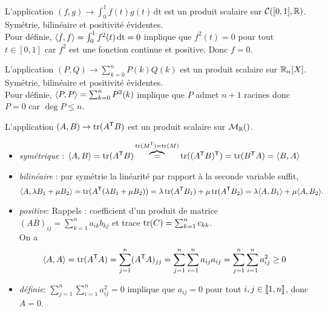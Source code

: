 \documentclass{book}
\begin{document}
\begin{Exemple}
L'application $(f,g)\to \int_0^1 f(t)g(t)\,\mathrm{dt} $ est un produit scalaire sur  $\mathcal{C}([0,1],\mathbb{R} )$.\\
Symétrie, bilinéaire et positivité évidentes.\\Pour définie, 
$\langle f,f\rangle=\int_0^1 f^2(t)\,\mathrm{dt}=0$ implique que $f^2(t)=0$ pour tout $t\in[0,1]$ car $f^2$ est une fonction continue et positive. Donc $f=0$.
\end{Exemple}
\begin{Exemple}
L'application $(P,Q)\to \sum_{k=0}^n  P(k)Q(k) $ est un produit scalaire sur  $\mathbb{R}_n[X]$.\\
Symétrie, bilinéaire et positivité évidentes.\\Pour définie, 
$\langle P,P\rangle=\sum_{k=0}^n  P^2(k)$ implique que $P$ admet $n+1$ racines donc $P=0$ car $\deg P \leq n$.
\end{Exemple}
\begin{Exemple}
L'application $(A,B)\to \operatorname{tr} (A^{\mathsf {T}}B)$ est un produit scalaire sur  $\Mn{\R}$.
\begin{itemize}
\item \emph{symétrique} : $\langle A,B\rangle =\operatorname{tr} (A^{\mathsf {T}}B)  \overbrace{=}^{\operatorname{tr} (M^{\mathsf {T}})=\operatorname{tr} (M) }\operatorname{tr} ((A^{\mathsf {T}}B)^{\mathsf {T}})= \operatorname{tr} (B^{\mathsf {T}}A) =\langle B,A\rangle$
\item \emph{bilinéaire} : par symétrie la linéarité par rapport à la seconde variable suffit,   $$\langle A,\lambda B_1+\mu  B_2 \rangle= \operatorname{tr} (A^{\mathsf {T}}(\lambda B_1+\mu  B_2))=\lambda\operatorname{tr} (A^{\mathsf {T}}B_1)+\mu\operatorname{tr} (A^{\mathsf {T}}B_2)= \lambda\langle A, B_1\rangle +\mu  \langle A,B_2 \rangle.$$
\item \emph{positive}: Rappels : coefficient d'un produit de matrice $(AB)_{i j}=\sum_{k=1}^n a_{i k}b_{k j}$ et trace $\operatorname{tr} (C)=\sum_{k=1}^{n}c_{kk}$.\\
On a $$\langle A,A\rangle=\operatorname{tr} (A^{\mathsf {T}}A) = \sum_{j=1}^{n}  (A^{\mathsf {T}} A)_{j j} =\sum_{j=1}^{n} \sum_{i=1}^{n}a_{i j} a_{i j}=\sum_{j=1}^{n} \sum_{i=1}^{n} a^2_{i j}\geq 0$$
\item \emph{définie}: $\sum_{j=1}^{n} \sum_{i=1}^{n} a^2_{i j}=0$ implique que  $a_{i j}=0$ pour tout $i,j\in \mathopen\lbrack\!\lbrack1,n \mathclose\rbrack\!\rbrack$, donc $A=0$.
\end{itemize}
\end{Exemple}
\end{document}
